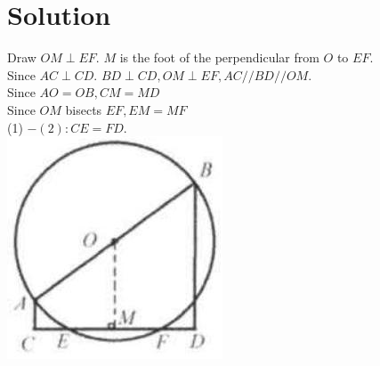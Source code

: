 \documentclass{article}
\begin{document}
\section*{Solution}
Draw \(O M \perp E F\). \(M\) is the foot of the perpendicular from \(O\) to \(E F\).\\
Since \(A C \perp C D\). \(B D \perp C D, O M \perp E F, A C / / B D / / O M\).\\
Since \(A O=O B, C M=M D\)\\
Since \(O M\) bisects \(E F, E M=M F\)\\
(1) \(-(2): C E=F D\).\\
\centering
\includegraphics[width=\textwidth]{images/158.jpg}
\end{document}
